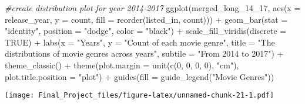 \documentclass[
]{article}
\newenvironment{Shaded}{\begin{snugshade}}{\end{snugshade}}
\newcommand{\AttributeTok}[1]{\textcolor[rgb]{0.77,0.63,0.00}{#1}}
\newcommand{\CommentTok}[1]{\textcolor[rgb]{0.56,0.35,0.01}{\textit{#1}}}
\newcommand{\ConstantTok}[1]{\textcolor[rgb]{0.00,0.00,0.00}{#1}}
\newcommand{\DecValTok}[1]{\textcolor[rgb]{0.00,0.00,0.81}{#1}}
\newcommand{\FunctionTok}[1]{\textcolor[rgb]{0.00,0.00,0.00}{#1}}
\newcommand{\NormalTok}[1]{#1}
\newcommand{\SpecialCharTok}[1]{\textcolor[rgb]{0.00,0.00,0.00}{#1}}
\newcommand{\StringTok}[1]{\textcolor[rgb]{0.31,0.60,0.02}{#1}}
\begin{document}
\begin{Shaded}
\begin{Highlighting}[]
\CommentTok{\#create distribution plot for year 2014{-}2017}
\FunctionTok{ggplot}\NormalTok{(merged\_long\_14\_17, }\FunctionTok{aes}\NormalTok{(}\AttributeTok{x =}\NormalTok{ release\_year, }\AttributeTok{y =}\NormalTok{ count, }\AttributeTok{fill =} \FunctionTok{reorder}\NormalTok{(listed\_in, count))) }\SpecialCharTok{+} 
  \FunctionTok{geom\_bar}\NormalTok{(}\AttributeTok{stat =} \StringTok{"identity"}\NormalTok{,}
           \AttributeTok{position =} \StringTok{"dodge"}\NormalTok{,}
           \AttributeTok{color =} \StringTok{"black"}\NormalTok{) }\SpecialCharTok{+} 
  \FunctionTok{scale\_fill\_viridis}\NormalTok{(}\AttributeTok{discrete =} \ConstantTok{TRUE}\NormalTok{) }\SpecialCharTok{+}
  \FunctionTok{labs}\NormalTok{(}\AttributeTok{x =} \StringTok{"Years"}\NormalTok{,}
       \AttributeTok{y =} \StringTok{"Count of each movie genre"}\NormalTok{,}
       \AttributeTok{title =} \StringTok{"The distributions of movie genres across years"}\NormalTok{,}
       \AttributeTok{subtile =} \StringTok{"From 2014 to 2017"}\NormalTok{) }\SpecialCharTok{+}
  \FunctionTok{theme\_classic}\NormalTok{() }\SpecialCharTok{+}
  \FunctionTok{theme}\NormalTok{(}\AttributeTok{plot.margin =} \FunctionTok{unit}\NormalTok{(}\FunctionTok{c}\NormalTok{(}\DecValTok{0}\NormalTok{, }\DecValTok{0}\NormalTok{, }\DecValTok{0}\NormalTok{, }\DecValTok{0}\NormalTok{), }\StringTok{"cm"}\NormalTok{),}
        \AttributeTok{plot.title.position =} \StringTok{"plot"}\NormalTok{) }\SpecialCharTok{+}
  \FunctionTok{guides}\NormalTok{(}\AttributeTok{fill =} \FunctionTok{guide\_legend}\NormalTok{(}\StringTok{"Movie Genres"}\NormalTok{))}
\end{Highlighting}
\end{Shaded}

\texttt{[image: Final\_Project\_files/figure-latex/unnamed-chunk-21-1.pdf]}
\end{document}
